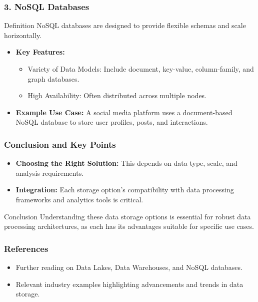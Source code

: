 \documentclass[aspectratio=169]{beamer}
\begin{document}
\begin{frame}[fragile]
    \frametitle{3. NoSQL Databases}
    \begin{block}{Definition}
        NoSQL databases are designed to provide flexible schemas and scale horizontally.
    \end{block}
    \begin{itemize}
        \item \textbf{Key Features:}
        \begin{itemize}
            \item Variety of Data Models: Include document, key-value, column-family, and graph databases.
            \item High Availability: Often distributed across multiple nodes.
        \end{itemize}
        \item \textbf{Example Use Case:} A social media platform uses a document-based NoSQL database to store user profiles, posts, and interactions.
    \end{itemize}
\end{frame}

\begin{frame}[fragile]
    \frametitle{Conclusion and Key Points}
    \begin{itemize}
        \item \textbf{Choosing the Right Solution:} This depends on data type, scale, and analysis requirements.
        \item \textbf{Integration:} Each storage option's compatibility with data processing frameworks and analytics tools is critical.
    \end{itemize}
    \begin{block}{Conclusion}
        Understanding these data storage options is essential for robust data processing architectures, as each has its advantages suitable for specific use cases.
    \end{block}
\end{frame}

\begin{frame}[fragile]
    \frametitle{References}
    \begin{itemize}
        \item Further reading on Data Lakes, Data Warehouses, and NoSQL databases.
        \item Relevant industry examples highlighting advancements and trends in data storage.
    \end{itemize}
\end{frame}
\end{document}
